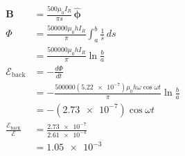 \documentclass{article}
\renewcommand{\vec}[1]{\boldsymbol{\mathbf{#1}}}
\newcommand{\uvec}[1]{\hat{\vec{#1}}}
\begin{document}
\begin{enumerate}
        \begin{align*}
          \vec{B}                                     & = \frac{500 \mu_0 I_R}{\pi s} \,\uvec{\phi}                                        \\
          \Phi                                        & = \frac{500000 \mu_0 h I_R}{\pi} \int_a^b \frac{1}{s} \,d s                        \\
                                                      & = \frac{500000 \mu_0 h I_R}{\pi} \ln \frac{b}{a}                                   \\
          \mathcal{E}_\text{back}                     & = -\frac{d \Phi}{d t}                                                              \\
                                                      & = -\frac{500000 (\num{5.22e-7}) \mu_0 h \omega \cos \omega t}{\pi} \ln \frac{b}{a} \\
                                                      & = -(\num{2.73e-7}) \cos \omega t                                                   \\
          \frac{\mathcal{E}_\text{back}}{\mathcal{E}} & = \frac{\num{2.73e-7}}{\num{2.61e-4}}                                              \\
                                                      & = \num{1.05e-3}
        \end{align*}
\end{enumerate}

\subsection{}
\end{document}
